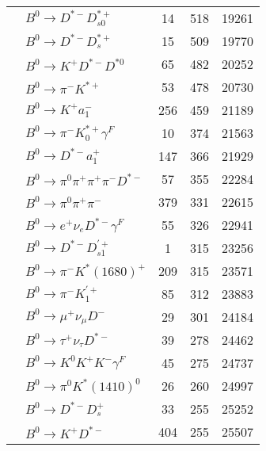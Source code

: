 \documentclass[landscape]{article}
\newcounter{rownumbers}
\newcommand\rn{\stepcounter{rownumbers}\arabic{rownumbers}}
\newcommand{\EOL}{\\} %
\newcommand{\topoTags}[1]{#1} %
\begin{document}
\begin{longtable}{clccc}
\rn & $ B^{0} \rightarrow D^{*-} D_{s0}^{*+} $ & \topoTags{14 & }518 & 19261 \EOL

\rn & $ B^{0} \rightarrow D^{*-} D_{s}^{*+} $ & \topoTags{15 & }509 & 19770 \EOL

\rn & $ B^{0} \rightarrow K^{+} D^{*-} D^{*0} $ & \topoTags{65 & }482 & 20252 \EOL

\rn & $ B^{0} \rightarrow \pi^{-} K^{*+} $ & \topoTags{53 & }478 & 20730 \EOL

\rn & $ B^{0} \rightarrow K^{+} a_{1}^{-} $ & \topoTags{256 & }459 & 21189 \EOL

\rn & $ B^{0} \rightarrow \pi^{-} K_{0}^{*+} \gamma^{F} $ & \topoTags{10 & }374 & 21563 \EOL

\rn & $ B^{0} \rightarrow D^{*-} a_{1}^{+} $ & \topoTags{147 & }366 & 21929 \EOL

\rn & $ B^{0} \rightarrow \pi^{0} \pi^{+} \pi^{+} \pi^{-} D^{*-} $ & \topoTags{57 & }355 & 22284 \EOL

\rn & $ B^{0} \rightarrow \pi^{0} \pi^{+} \pi^{-} $ & \topoTags{379 & }331 & 22615 \EOL

\rn & $ B^{0} \rightarrow e^{+} \nu_{e} D^{*-} \gamma^{F} $ & \topoTags{55 & }326 & 22941 \EOL

\rn & $ B^{0} \rightarrow D^{*-} D_{s1}^{\prime+} $ & \topoTags{1 & }315 & 23256 \EOL

\rn & $ B^{0} \rightarrow \pi^{-} K^{*}(1680)^{+} $ & \topoTags{209 & }315 & 23571 \EOL

\rn & $ B^{0} \rightarrow \pi^{-} K_1^{\prime+} $ & \topoTags{85 & }312 & 23883 \EOL

\rn & $ B^{0} \rightarrow \mu^{+} \nu_{\mu} D^{-} $ & \topoTags{29 & }301 & 24184 \EOL

\rn & $ B^{0} \rightarrow \tau^{+} \nu_{\tau} D^{*-} $ & \topoTags{39 & }278 & 24462 \EOL

\rn & $ B^{0} \rightarrow K^{0} K^{+} K^{-} \gamma^{F} $ & \topoTags{45 & }275 & 24737 \EOL

\rn & $ B^{0} \rightarrow \pi^{0} K^{*}(1410)^{0} $ & \topoTags{26 & }260 & 24997 \EOL

\rn & $ B^{0} \rightarrow D^{*-} D_{s}^{+} $ & \topoTags{33 & }255 & 25252 \EOL

\rn & $ B^{0} \rightarrow K^{+} D^{*-} $ & \topoTags{404 & }255 & 25507 \EOL


\end{longtable}
\end{document}
